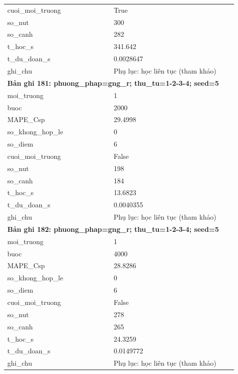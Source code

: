 \begin{longtable}{p{0.43\linewidth}p{0.50\linewidth}}
cuoi\_\allowbreak moi\_\allowbreak truong & True \\
so\_\allowbreak nut & 300 \\
so\_\allowbreak canh & 282 \\
t\_\allowbreak hoc\_\allowbreak s & 341.642 \\
t\_\allowbreak du\_\allowbreak doan\_\allowbreak s & 0.0028647 \\
ghi\_\allowbreak chu & Phụ lục: học liên tục (tham khảo) \\
\midrule
\multicolumn{2}{p{0.95\linewidth}}{\textbf{Bản ghi 181: phuong\_phap=gng\_r; thu\_tu=1-2-3-4; seed=5}} \\
moi\_\allowbreak truong & 1 \\
buoc & 2000 \\
MAPE\_\allowbreak Csp & 29.4998 \\
so\_\allowbreak khong\_\allowbreak hop\_\allowbreak le & 0 \\
so\_\allowbreak diem & 6 \\
cuoi\_\allowbreak moi\_\allowbreak truong & False \\
so\_\allowbreak nut & 198 \\
so\_\allowbreak canh & 184 \\
t\_\allowbreak hoc\_\allowbreak s & 13.6823 \\
t\_\allowbreak du\_\allowbreak doan\_\allowbreak s & 0.0040355 \\
ghi\_\allowbreak chu & Phụ lục: học liên tục (tham khảo) \\
\midrule
\multicolumn{2}{p{0.95\linewidth}}{\textbf{Bản ghi 182: phuong\_phap=gng\_r; thu\_tu=1-2-3-4; seed=5}} \\
moi\_\allowbreak truong & 1 \\
buoc & 4000 \\
MAPE\_\allowbreak Csp & 28.8286 \\
so\_\allowbreak khong\_\allowbreak hop\_\allowbreak le & 0 \\
so\_\allowbreak diem & 6 \\
cuoi\_\allowbreak moi\_\allowbreak truong & False \\
so\_\allowbreak nut & 278 \\
so\_\allowbreak canh & 265 \\
t\_\allowbreak hoc\_\allowbreak s & 24.3259 \\
t\_\allowbreak du\_\allowbreak doan\_\allowbreak s & 0.0149772 \\
ghi\_\allowbreak chu & Phụ lục: học liên tục (tham khảo) \\

\end{longtable}
